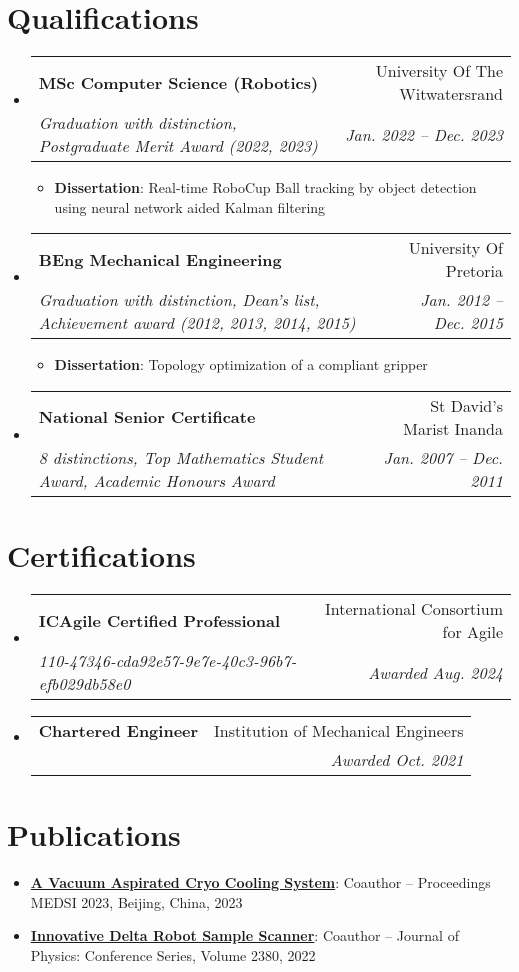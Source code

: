 \documentclass[letterpaper,11pt]{article}
\makeatletter
\newcommand{\resumeItem}[2]{
  \item\small{
    \textbf{#1}{: #2 \vspace{-2pt}}
  }
}
\newcommand{\resumeSubheading}[4]{
  \vspace{-1pt}\item
    \begin{tabular*}{0.97\textwidth}[t]{l@{\extracolsep{\fill}}r}
      \textbf{#1} & #2 \\
      \textit{\small#3} & \textit{\small #4} \\
    \end{tabular*}\vspace{-5pt}
}
\newcommand{\resumeSubItem}[2]{\resumeItem{#1}{#2}\vspace{-4pt}}
\newcommand{\resumeSubHeadingListStart}{\begin{itemize}[leftmargin=*]}
\newcommand{\resumeSubHeadingListEnd}{\end{itemize}}
\makeatother
\begin{document}
\section{Qualifications}
  \resumeSubHeadingListStart
    \resumeSubheading
      {MSc Computer Science (Robotics)} {University Of The Witwatersrand}
      {Graduation with distinction, Postgraduate Merit Award (2022, 2023)}{Jan. 2022 -- Dec. 2023}
        \resumeSubHeadingListStart
			\resumeSubItem{Dissertation}
      		{Real-time RoboCup Ball tracking by object detection using neural network aided Kalman filtering}
		\resumeSubHeadingListEnd
    \resumeSubheading
      {BEng Mechanical Engineering}{University Of Pretoria}
      {Graduation with distinction, Dean's list, Achievement award (2012, 2013, 2014, 2015)}{Jan. 2012 -- Dec. 2015}
    	\resumeSubHeadingListStart
			\resumeSubItem{Dissertation}
      		{Topology optimization of a compliant gripper}
		\resumeSubHeadingListEnd
     \resumeSubheading
      {National Senior Certificate}{St David’s Marist Inanda}
      {8 distinctions, Top Mathematics Student Award, Academic Honours Award}{Jan. 2007 -- Dec. 2011}
  \resumeSubHeadingListEnd

\section{Certifications}
  \resumeSubHeadingListStart
      \resumeSubheading
      {ICAgile Certified Professional} {International Consortium for Agile}
      {110-47346-cda92e57-9e7e-40c3-96b7-efb029db58e0}{Awarded Aug. 2024}
    \resumeSubheading
      {Chartered Engineer} {Institution of Mechanical Engineers}
      {}{Awarded Oct. 2021}
  \resumeSubHeadingListEnd

\section{Publications}
  \resumeSubHeadingListStart
    \resumeSubItem{\href{https://accelconf.web.cern.ch/medsi2023/papers/weoam02.pdf}{A Vacuum Aspirated Cryo Cooling System}}
      {Coauthor -- Proceedings MEDSI 2023, Beijing, China, 2023}
    \resumeSubItem{\href{https://iopscience.iop.org/article/10.1088/1742-6596/2380/1/012113/pdf}{Innovative Delta Robot Sample Scanner}}
      {Coauthor -- Journal of Physics: Conference Series, Volume 2380, 2022}
  \resumeSubHeadingListEnd

%


\end{document}
